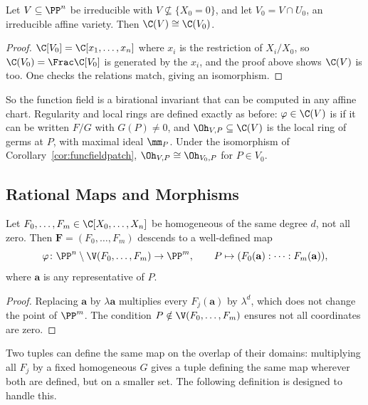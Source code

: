 \begin{corollary}\label{cor:funcfieldpatch}
	Let $V \subseteq \PP^n$ be irreducible with $V \not\subseteq \{X_0 = 0\}$, and let $V_0 = V \cap U_0$, an irreducible affine variety. Then $\C(V) \cong \C(V_0)$.
\end{corollary}

\begin{proof}
	$\C[V_0] = \C[x_1,\dots,x_n]$ where $x_i$ is the restriction of $X_i/X_0$, so $\C(V_0) = \Frac \C[V_0]$ is generated by the $x_i$, and the proof above shows $\C(V)$ is too. One checks the relations match, giving an isomorphism.
\end{proof}

So the function field is a birational invariant that can be computed in any affine chart. Regularity and local rings are defined exactly as before: $\varphi \in \C(V)$ is  if it can be written $F/G$ with $G(P) \neq 0$, and $\Oh_{V,P} \subseteq \C(V)$ is the local ring of germs at $P$, with maximal ideal $\mm_P$. Under the isomorphism of Corollary~\ref{cor:funcfieldpatch}, $\Oh_{V,P} \cong \Oh_{V_0,P}$ for $P \in V_0$.

\subsection{Rational Maps and Morphisms}

\begin{proposition}
	Let $F_0,\dots,F_m \in \C[X_0,\dots,X_n]$ be homogeneous of the same degree $d$, not all zero. Then $\mathbf F = (F_0,\dots,F_m)$ descends to a well-defined map
	$$\varphi \colon \PP^n \setminus \V(F_0,\dots,F_m) \to \PP^m, \qquad P \mapsto (F_0(\mathbf a) : \cdots : F_m(\mathbf a)),$$
	where $\mathbf a$ is any representative of $P$.
\end{proposition}

\begin{proof}
	Replacing $\mathbf a$ by $\lambda\mathbf a$ multiplies every $F_j(\mathbf a)$ by $\lambda^d$, which does not change the point of $\PP^m$. The condition $P \notin \V(F_0,\dots,F_m)$ ensures not all coordinates are zero.
\end{proof}

Two tuples can define the same map on the overlap of their domains: multiplying all $F_j$ by a fixed homogeneous $G$ gives a tuple defining the same map wherever both are defined, but on a smaller set. The following definition is designed to handle this.


